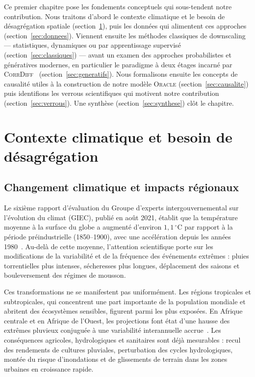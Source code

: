 \documentclass[14pt,a4paper,openany]{extreport}
\theoremstyle{definition}
\newcommand{\Oracle}{\textsc{Oracle}}
\newcommand{\CorrDiff}{\textsc{CorrDiff}}
\begin{document}
Ce premier chapitre pose les fondements conceptuels qui sous-tendent notre contribution. Nous traitons d'abord le contexte climatique et le besoin de désagrégation spatiale (section~\ref{sec:contexte}), puis les données qui alimentent ces approches (section~\ref{sec:donnees}). Viennent ensuite les méthodes classiques de downscaling --- statistiques, dynamiques ou par apprentissage supervisé (section~\ref{sec:classiques}) --- avant un examen des approches probabilistes et génératives modernes, en particulier le paradigme à deux étages incarné par \CorrDiff{}~\cite{mardani_corrdiff_2023} (section~\ref{sec:generatifs}). Nous formalisons ensuite les concepts de causalité utiles à la construction de notre modèle \Oracle{} (section~\ref{sec:causalite}) puis identifions les verrous scientifiques qui motivent notre contribution (section~\ref{sec:verrous}). Une synthèse (section~\ref{sec:synthese}) clôt le chapitre.

\section{Contexte climatique et besoin de désagrégation}
\label{sec:contexte}

\subsection{Changement climatique et impacts régionaux}
\label{ssec:cc-regional}

Le sixième rapport d'évaluation du Groupe d'experts intergouvernemental sur l'évolution du climat (GIEC), publié en août 2021, établit que la température moyenne à la surface du globe a augmenté d'environ $1{,}1\,^{\circ}\mathrm{C}$ par rapport à la période préindustrielle (1850--1900), avec une accélération depuis les années 1980~\cite{ipcc_ar6_2021}. Au-delà de cette moyenne, l'attention scientifique porte sur les modifications de la variabilité et de la fréquence des événements extrêmes : pluies torrentielles plus intenses, sécheresses plus longues, déplacement des saisons et bouleversement des régimes de mousson.

Ces transformations ne se manifestent pas uniformément. Les régions tropicales et subtropicales, qui concentrent une part importante de la population mondiale et abritent des écosystèmes sensibles, figurent parmi les plus exposées. En Afrique centrale et en Afrique de l'Ouest, les projections font état d'une hausse des extrêmes pluvieux conjuguée à une variabilité interannuelle accrue~\cite{ipcc_ar6_2021,almazroui_2020}. Les conséquences agricoles, hydrologiques et sanitaires sont déjà mesurables : recul des rendements de cultures pluviales, perturbation des cycles hydrologiques, montée du risque d'inondations et de glissements de terrain dans les zones urbaines en croissance rapide.
\end{document}
